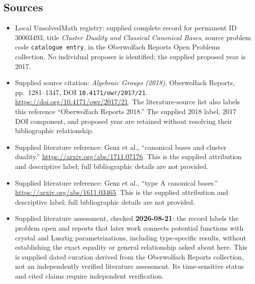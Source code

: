 \documentclass[11pt]{article}
\begin{document}
\subsection{Sources}
\begin{itemize}
\item Local UnsolvedMath registry: supplied complete record for permanent ID \(30003493\), title \emph{Cluster Duality and Classical Canonical Bases}, source problem code \texttt{catalogue entry}, in the Oberwolfach Reports Open Problems collection. No individual proposer is identified; the supplied proposed year is 2017.
\item Supplied source citation: \emph{Algebraic Groups (2018)}, Oberwolfach Reports, pp.\ 1281--1347, DOI \texttt{10.4171/owr/2017/21}. \url{https://doi.org/10.4171/owr/2017/21}. The literature-source list also labels this reference ``Oberwolfach Reports 2018.'' The supplied 2018 label, 2017 DOI component, and proposed year are retained without resolving their bibliographic relationship.
\item Supplied literature reference: Genz et al., ``canonical bases and cluster duality.'' \url{https://arxiv.org/abs/1711.07176}. This is the supplied attribution and descriptive label; full bibliographic details are not provided.
\item Supplied literature reference: Genz et al., ``type A canonical bases.'' \url{https://arxiv.org/abs/1611.03465}. This is the supplied attribution and descriptive label; full bibliographic details are not provided.
\item Supplied literature assessment, checked \textbf{2026-08-21}: the record labels the problem open and reports that later work connects potential functions with crystal and Lusztig parametrizations, including type-specific results, without establishing the exact equality or general relationship asked about here. This is supplied dated curation derived from the Oberwolfach Reports collection, not an independently verified literature assessment. Its time-sensitive status and cited claims require independent verification.
\end{itemize}
\end{document}
